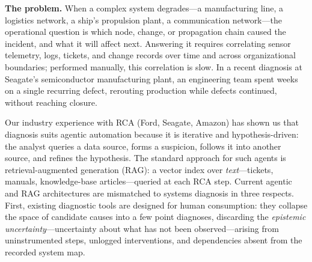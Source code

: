 \documentclass[12pt]{article}
\begin{document}
\textbf{The problem.} When a complex system degrades---a manufacturing line, a logistics network, a ship's propulsion plant, a communication network---the operational question is which node, change, or propagation chain caused the incident, and what it will affect next. Answering it requires correlating sensor telemetry, logs, tickets, and change records over time and across organizational boundaries; performed manually, this correlation is slow. In a recent diagnosis at Seagate's semiconductor manufacturing plant, an engineering team spent weeks on a single recurring defect, rerouting production while defects continued, without reaching closure.

Our industry experience with RCA (Ford, Seagate, Amazon) has shown us that diagnosis suits agentic automation because it is iterative and hypothesis-driven: the analyst queries a data source, forms a suspicion, follows it into another source, and refines the hypothesis. The standard approach for such agents is retrieval-augmented generation (RAG): a vector index over \emph{text}---tickets, manuals, knowledge-base articles---queried at each RCA step. Current agentic and RAG architectures are mismatched to systems diagnosis in three respects. First, existing diagnostic tools are designed for human consumption: they collapse the space of candidate causes into a few point diagnoses, discarding the \emph{epistemic uncertainty}---uncertainty about what has not been observed---arising from uninstrumented steps, unlogged interventions, and dependencies absent from the recorded system map.
\end{document}
